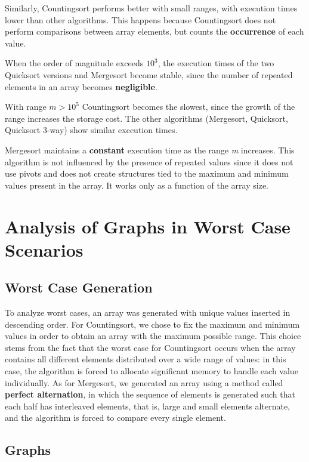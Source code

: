 \documentclass{article}
\begin{document}
Similarly, Countingsort performs better with small ranges, with execution times lower than other algorithms. This happens because Countingsort does not perform comparisons between array elements, but counts the \textbf{occurrence} of each value.

When the order of magnitude exceeds $10^3$, the execution times of the two Quicksort versions and Mergesort become stable, since the number of repeated elements in an array becomes \textbf{negligible}.

With range $m > 10^5$ Countingsort becomes the slowest, since the growth of the range increases the storage cost.
The other algorithms (Mergesort, Quicksort, Quicksort 3-way) show similar execution times.

Mergesort maintains a \textbf{constant} execution time as the range \emph{m} increases. This algorithm is not influenced by the presence of repeated values since it does not use pivots and does not create structures tied to the maximum and minimum values present in the array. It works only as a function of the array size.

\section{Analysis of Graphs in Worst Case Scenarios}
\label{sec:peggiori}

\subsection*{Worst Case Generation}

To analyze worst cases, an array was generated with unique values inserted in descending order. For Countingsort, we chose to fix the maximum and minimum values in order to obtain an array with the maximum possible range. This choice stems from the fact that the worst case for Countingsort occurs when the array contains all different elements distributed over a wide range of values: in this case, the algorithm is forced to allocate significant memory to handle each value individually. As for Mergesort, we generated an array using a method called \textbf{perfect alternation}, in which the sequence of elements is generated such that each half has interleaved elements, that is, large and small elements alternate, and the algorithm is forced to compare every single element.

\subsection*{Graphs}
\end{document}
